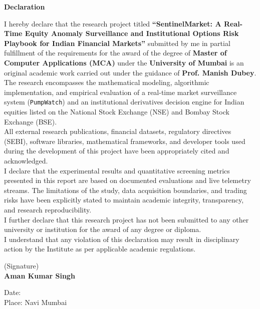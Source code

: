 \begin{center}
{\LARGE \textbf{Declaration}}\\[1.5cm]
\end{center}

\noindent I hereby declare that the research project titled \textbf{``SentinelMarket: A Real-Time Equity Anomaly Surveillance and Institutional Options Risk Playbook for Indian Financial Markets''} submitted by me in partial fulfillment of the requirements for the award of the degree of \textbf{Master of Computer Applications (MCA)} under the \textbf{University of Mumbai} is an original academic work carried out under the guidance of \textbf{Prof. Manish Dubey}.\\[0.6cm]

\noindent The research encompasses the mathematical modeling, algorithmic implementation, and empirical evaluation of a real-time market surveillance system (\texttt{PumpWatch}) and an institutional derivatives decision engine for Indian equities listed on the National Stock Exchange (NSE) and Bombay Stock Exchange (BSE).\\[0.6cm]

\noindent All external research publications, financial datasets, regulatory directives (SEBI), software libraries, mathematical frameworks, and developer tools used during the development of this project have been appropriately cited and acknowledged.\\[0.6cm]

\noindent I declare that the experimental results and quantitative screening metrics presented in this report are based on documented evaluations and live telemetry streams. The limitations of the study, data acquisition boundaries, and trading risks have been explicitly stated to maintain academic integrity, transparency, and research reproducibility.\\[0.6cm]

\noindent I further declare that this research project has not been submitted to any other university or institution for the award of any degree or diploma.\\[0.6cm]

\noindent I understand that any violation of this declaration may result in disciplinary action by the Institute as per applicable academic regulations.\\[2.5cm]

\begin{flushright}
(Signature)\\[0.4cm]
\textbf{Aman Kumar Singh}
\end{flushright}

\vspace{1.5cm}
\noindent Date:\\[0.2cm]
\noindent Place: Navi Mumbai

\newpage
